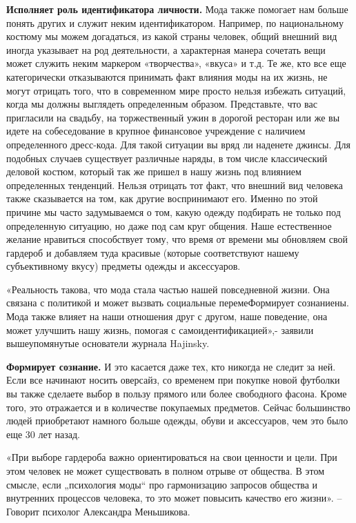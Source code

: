\textbf{Исполняет роль идентификатора личности.}
Мода также помогает нам больше понять других и служит неким идентификатором. Например, по национальному костюму мы можем догадаться, из какой страны человек, общий внешний вид иногда указывает на род деятельности, а характерная манера сочетать вещи может служить неким маркером «творчества», «вкуса» и т.д. Те же, кто все еще категорически отказываются принимать факт влияния моды на их жизнь, не могут отрицать того, что в современном мире просто нельзя избежать ситуаций, когда мы должны выглядеть определенным образом. Представьте, что вас пригласили на свадьбу, на торжественный ужин в дорогой ресторан или же вы идете на собеседование в крупное финансовое учреждение с наличием определенного дресс-кода. Для такой ситуации вы вряд ли наденете джинсы. Для подобных случаев существует различные наряды, в том числе классический деловой костюм, который так же пришел в нашу жизнь под влиянием определенных тенденций. Нельзя отрицать тот факт, что внешний вид человека также сказывается на том, как другие воспринимают его. Именно по этой причине мы часто задумываемся о том, какую одежду подбирать не только под определенную ситуацию, но даже под сам круг общения. Наше естественное желание нравиться способствует тому, что время от времени мы обновляем свой гардероб и добавляем туда красивые (которые соответствуют нашему субъективному вкусу) предметы одежды и аксессуаров.

\begin{fancyquotes}
    «Реальность такова, что мода стала частью нашей повседневной жизни. Она связана с политикой и может вызвать социальные перемеФормирует сознаниены. Мода также влияет на наши отношения друг с другом, наше поведение, она может улучшить нашу жизнь, помогая с самоидентификацией»,- заявили вышеупомянутые основатели журнала Hajinsky.
\end{fancyquotes}

\textbf{Формирует сознание.}
И это касается даже тех, кто никогда не следит за ней. Если все начинают носить оверсайз, со временем при покупке новой футболки вы также сделаете выбор в пользу прямого или более свободного фасона. Кроме того, это отражается и в количестве покупаемых предметов. Сейчас большинство людей приобретают намного больше одежды, обуви и аксессуаров, чем это было еще 30 лет назад.

\begin{fancyquotes}
    «При выборе гардероба важно ориентироваться на свои ценности и цели. При этом человек не может существовать в полном отрыве от общества. В этом смысле, если „психология моды“ про гармонизацию запросов общества и внутренних процессов человека, то это может повысить качество его жизни». – Говорит психолог Александра Меньшикова.
\end{fancyquotes}

